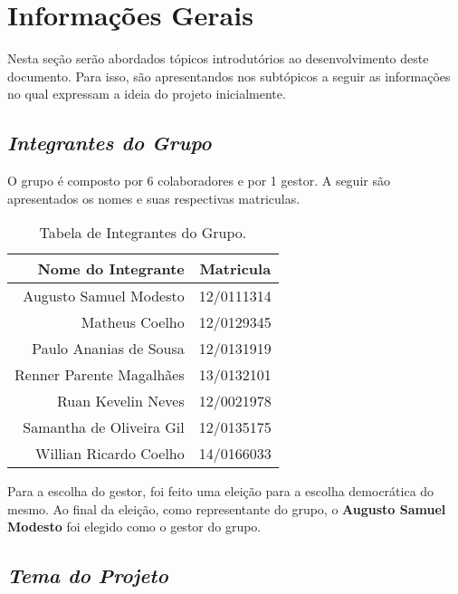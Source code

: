 \chapter[Informações Gerais]{Informações Gerais}
\label{chap:informacoesGerais}
	
	Nesta seção serão abordados tópicos introdutórios ao desenvolvimento deste documento. Para isso, são apresentandos nos subtópicos a seguir as informações no qual expressam a ideia do projeto inicialmente.

	\section[Integrantes do Grupo]{\emph{Integrantes do Grupo}}
	\label{sec:informacoesGerais_integrantes}

		O grupo é composto por 6 colaboradores e por 1 gestor. A seguir são apresentados os nomes e suas respectivas matriculas.

		\label{subsubsec:informacoesGerais_integrantes_tables}
		\begin{table}[h]
			\centering 
			\begin{tabular}{r|c}

				Nome do Integrante & Matricula \\
				
				\hline

				Augusto Samuel Modesto & 12/0111314 \\
				Matheus Coelho & 12/0129345 \\
				Paulo Ananias de Sousa & 12/0131919 \\
				Renner Parente Magalhães & 13/0132101 \\
				Ruan Kevelin Neves & 12/0021978 \\
				Samantha de Oliveira Gil & 12/0135175 \\
				Willian Ricardo Coelho & 14/0166033 \\

			\end{tabular}
			\caption[Tabela de Integrantes do Grupo]{Tabela de Integrantes do Grupo.}
			\label{tab:informacoesGerais_integrantes_.tables}
		\end{table}

		Para a escolha do gestor, foi feito uma eleição para a escolha democrática do mesmo. Ao final da eleição, como representante do grupo, o \textbf{Augusto Samuel Modesto} foi elegido como o gestor do grupo.

	\section[Tema do Projeto]{\emph{Tema do Projeto}}
	\label{sec:informacoesGerais_tema}


